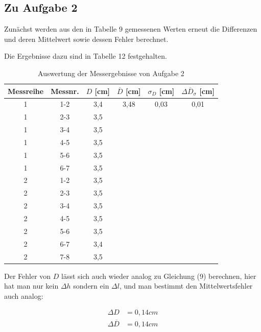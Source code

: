 \documentclass{article}
\begin{document}
\newpage

\subsection{Zu Aufgabe 2}

Zunächst werden aus den in Tabelle 9 gemessenen Werten erneut die Differenzen und deren Mittelwert sowie dessen Fehler berechnet. 

Die Ergebnisse dazu sind in Tabelle 12 festgehalten.

\begin{table}[h]
    \centering
    \caption{Auswertung der Messergebnisse von Aufgabe 2}
    \begin{tabular}{c|c|c|c|c|c}
        Messreihe & Messnr. & $D$ [cm] & $\overline{D}$ [cm] & $\sigma_{D}$ [cm] & $\Delta \overline{D}_{\sigma}$ [cm] \\ \hline
        1 & 1-2 & 3,4 & 3,48 & 0,03 & 0,01 \\
        1 & 2-3 & 3,5 &  &  & \\
        1 & 3-4 & 3,5 &  &  & \\
        1 & 4-5 & 3,5 &  &  & \\
        1 & 5-6 & 3,5 &  &  & \\
        1 & 6-7 & 3,5 &  &  & \\ \cline{1-3}
        2 & 1-2 & 3,5 &  &  & \\
        2 & 2-3 & 3,5 &  &  & \\
        2 & 3-4 & 3,5 &  &  & \\
        2 & 4-5 & 3,5 &  &  & \\
        2 & 5-6 & 3,5 &  &  & \\
        2 & 6-7 & 3,4 &  &  & \\
        2 & 7-8 & 3,5 &  &  & 
\end{tabular}
\end{table}

Der Fehler von $D$ lässt sich auch wieder analog zu Gleichung (9) berechnen, hier hat man nur kein $\Delta h$ sondern ein $\Delta l$, und man bestimmt den Mittelwertsfehler auch analog:

\begin{equation}
    \begin{split}
        \Delta D &= 0,14 cm \\
        \Delta \overline{D} &= 0,14cm
    \end{split}
\end{equation}

\end{document}
